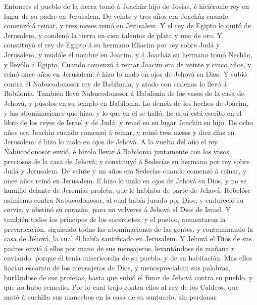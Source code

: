  Entonces el pueblo de la tierra tomó á Joachâz hijo de
Josías, é hiciéronle rey en lugar de su padre en Jerusalem. 
De veinte y tres años era Joachâz cuando comenzó á reinar, y tres meses
reinó en Jerusalem.  Y el rey de Egipto lo quitó de
Jerusalem, y condenó la tierra en cien talentos de plata y uno de oro.
 Y constituyó el rey de Egipto á su hermano Eliacim por rey
sobre Judá y Jerusalem, y mudóle el nombre en Joacim; y á Joachâz su
hermano tomó Nechâo, y llevólo á Egipto.  Cuando comenzó á
reinar Joacim era de veinte y cinco años, y reinó once años en
Jerusalem: é hizo lo malo en ojos de Jehová su Dios.  Y
subió contra él Nabucodonosor rey de Babilonia, y atado con cadenas lo
llevó á Babilonia.  También llevó Nabucodonosor á Babilonia
de los vasos de la casa de Jehová, y púsolos en su templo en Babilonia.
 Lo demás de los hechos de Joacim, y las abominaciones que
hizo, y lo que en él se halló, he aquí está escrito en el libro de los
reyes de Israel y de Judá: y reinó en su lugar Joachîn su hijo.
 De ocho años era Joachîn cuando comenzó á reinar, y reinó
tres meses y diez días en Jerusalem: é hizo lo malo en ojos de Jehová.
 A la vuelta del año el rey Nabucodonosor envió, é hízolo
llevar á Babilonia juntamente con los vasos preciosos de la casa de
Jehová; y constituyó á Sedecías su hermano por rey sobre Judá y
Jerusalem.  De veinte y un años era Sedecías cuando comenzó
á reinar, y once años reinó en Jerusalem.  E hizo lo malo
en ojos de Jehová su Dios, y no se humilló delante de Jeremías profeta,
que le hablaba de parte de Jehová.  Rebelóse asimismo
contra Nabucodonosor, al cual había jurado por Dios; y endureció su
cerviz, y obstinó su corazón, para no volverse á Jehová el Dios de
Israel.  Y también todos los príncipes de los sacerdotes, y
el pueblo, aumentaron la prevaricación, siguiendo todas las
abominaciones de las gentes, y contaminando la casa de Jehová, la cual
él había santificado en Jerusalem.  Y Jehová el Dios de sus
padres envió á ellos por mano de sus mensajeros, levantándose de mañana
y enviando: porque él tenía misericordia de su pueblo, y de su
habitación.  Mas ellos hacían escarnio de los mensajeros de
Dios, y menospreciaban sus palabras, burlándose de sus profetas, hasta
que subió el furor de Jehová contra su pueblo, y que no hubo remedio.
 Por lo cual trajo contra ellos al rey de los Caldeos, que
mató á cuchillo sus mancebos en la casa de su santuario, sin perdonar
